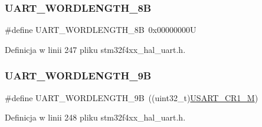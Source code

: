 \subsubsection{\texorpdfstring{U\+A\+R\+T\+\_\+\+W\+O\+R\+D\+L\+E\+N\+G\+T\+H\+\_\+8B}{UART\_WORDLENGTH\_8B}}
{\footnotesize\ttfamily \#define U\+A\+R\+T\+\_\+\+W\+O\+R\+D\+L\+E\+N\+G\+T\+H\+\_\+8B~0x00000000U}



Definicja w linii 247 pliku stm32f4xx\+\_\+hal\+\_\+uart.\+h.

\mbox{\label{group___u_a_r_t___word___length_gaf867be43de35fd3c32fe0b4dd4058f7e}} 
\subsubsection{\texorpdfstring{U\+A\+R\+T\+\_\+\+W\+O\+R\+D\+L\+E\+N\+G\+T\+H\+\_\+9B}{UART\_WORDLENGTH\_9B}}
{\footnotesize\ttfamily \#define U\+A\+R\+T\+\_\+\+W\+O\+R\+D\+L\+E\+N\+G\+T\+H\+\_\+9B~((uint32\+\_\+t)\hyperlink{group___peripheral___registers___bits___definition_ga95f0288b9c6aaeca7cb6550a2e6833e2}{U\+S\+A\+R\+T\+\_\+\+C\+R1\+\_\+M})}



Definicja w linii 248 pliku stm32f4xx\+\_\+hal\+\_\+uart.\+h.

